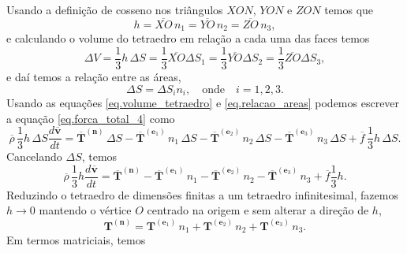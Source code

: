 Usando a defini\c{c}\~ao de cosseno nos tri\^angulos $XON$, $YON$ e $ZON$ temos que
\begin{equation*}
h=\overline{XO}\,n_1=\overline{YO}\,n_2=\overline{ZO}\,n_3,
\end{equation*}
e calculando o volume do tetraedro em rela\c{c}\~ao a cada uma das faces temos
\begin{equation}\label{eq.volume_tetraedro}
\Delta V=\frac{1}{3}h\,\Delta S=\frac{1}{3}\overline{XO}\Delta S_1=\frac{1}{3}\overline{YO}\Delta S_2=\frac{1}{3}\overline{ZO}\Delta S_3,
\end{equation}
e da\'i temos a rela\c{c}\~ao entre as \'areas,
\begin{equation}\label{eq.relacao_areas}
\Delta S=\Delta S_in_i,\quad\text{onde}\quad i=1,2,3.
\end{equation}
Usando as equa\c{c}\~oes \ref{eq.volume_tetraedro} e \ref{eq.relacao_areas} podemos escrever a equa\c{c}\~ao \ref{eq.forca_total_4} como
\begin{equation*}
\overline{\rho}\,\frac{1}{3}h\,\Delta S\frac{d\overline{\mathbf{v}}}{dt}=\mathbf{\overline{T}}^{(\mathbf{n})}\,\Delta S-\mathbf{\overline{T}}^{(\mathbf{e}_1)}\,n_1\,\Delta S-\mathbf{\overline{T}}^{(\mathbf{e}_2)}\,n_2\,\Delta S-\mathbf{\overline{T}}^{(\mathbf{e}_3)}\,n_3\,\Delta S+\overline{f}\,\frac{1}{3}h\,\Delta S.
\end{equation*}
Cancelando $\Delta S$, temos
\begin{equation*}
\overline{\rho}\,\frac{1}{3}h\frac{d\overline{\mathbf{v}}}{dt}=\mathbf{\overline{T}}^{(\mathbf{n})}-\mathbf{\overline{T}}^{(\mathbf{e}_1)}\,n_1-\mathbf{\overline{T}}^{(\mathbf{e}_2)}\,n_2-\mathbf{\overline{T}}^{(\mathbf{e}_3)}\,n_3+\overline{f}\frac{1}{3}h.
\end{equation*}
Reduzindo o tetraedro de dimens\~oes finitas a um tetraedro infinitesimal, fazemos $h\to 0$ mantendo o v\'ertice $O$ centrado na origem e sem alterar a dire\c{c}\~ao de $h$,
\begin{equation*}
\mathbf{T}^{(\mathbf{n})}=\mathbf{T}^{(\mathbf{e}_1)}\,n_1+\mathbf{T}^{(\mathbf{e}_2)}\,n_2+\mathbf{T}^{(\mathbf{e}_3)}\,n_3.
\end{equation*}
Em termos matriciais, temos

